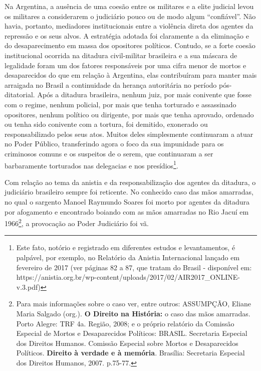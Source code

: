 Na Argentina, a ausência de uma coesão entre os militares e a elite
judicial levou os militares a considerarem o judiciário pouco ou de modo
algum ``confiável''. Não havia, portanto, mediadores institucionais
entre a violência direta dos agentes da repressão e os seus alvos. A
estratégia adotada foi claramente a da eliminação e do desaparecimento
em massa dos opositores políticos. Contudo, se a forte coesão
institucional ocorrida na ditadura civil-militar brasileira e a sua
máscara de legalidade foram um dos fatores responsáveis por uma cifra
menor de mortos e desaparecidos do que em relação à Argentina, elas
contribuíram para manter mais arraigada no Brasil a continuidade da
herança autoritária no período pós-ditatorial. Após a ditadura
brasileira, nenhum juiz, por mais conivente que fosse com o regime,
nenhum policial, por mais que tenha torturado e assassinado opositores,
nenhum político ou dirigente, por mais que tenha aprovado, ordenado ou
tenha sido conivente com a tortura, foi demitido, exonerado ou
responsabilizado pelos seus atos. Muitos deles simplesmente continuaram
a atuar no Poder Público, transferindo agora o foco da sua impunidade
para os criminosos comuns e os suspeitos de o serem, que continuaram a
ser barbaramente torturados nas delegacias e nos presídios\footnote{Este
  fato, notório e registrado em diferentes estudos e levantamentos, é
  palpável, por exemplo, no Relatório da Anistia Internacional lançado
  em fevereiro de 2017 (ver páginas 82 a 87, que tratam do Brasil -
  disponível em:
  https://anistia.org.br/wp-content/uploads/2017/02/AIR2017\_ONLINE-v.3.pdf)}.

Com relação ao tema da anistia e da responsabilização dos agentes da
ditadura, o judiciário brasileiro sempre foi reticente. No conhecido
caso das mãos amarradas, no qual o sargento Manoel Raymundo Soares foi
morto por agentes da ditadura por afogamento e encontrado boiando com as
mãos amarradas no Rio Jacuí em 1966\footnote{Para mais informações sobre
  o caso ver, entre outros: ASSUMPÇÃO, Eliane Maria Salgado (org.).
  \textbf{O Direito na História:} o caso das mãos amarradas. Porto
  Alegre: TRF 4a. Região, 2008; e o próprio relatório da Comissão
  Especial de Mortos e Desaparecidos Políticos: BRASIL. Secretaria
  Especial dos Direitos Humanos. Comissão Especial sobre Mortos e
  Desaparecidos Políticos. \textbf{Direito à verdade e à memória}.
  Brasília: Secretaria Especial dos Direitos Humanos, 2007. p.75-77.}, a
provocação ao Poder Judiciário foi vã.

